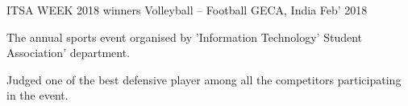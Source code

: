 

\begin{cventries}

  \cventry
    {ITSA WEEK 2018 winners} %
    {Volleyball -- Football} %
    {GECA, India} %
    {Feb' 2018} %
    {
     \begin{cvitems} %
        \item {The annual sports event organised by 'Information Technology' Student Association' department.}
        \item {Judged one of the best defensive player among all the competitors participating in the event.}
     \end{cvitems}
     }  

    
\iffalse 
 \cventry
    {} %
    {Badminton} %
    {GECA, India} %
    {} %
    {}
\cventry
    {} %
    {Painting and Sketching} %
    {GECA, India} %
    {} %
    {}
\fi
\end{cventries}